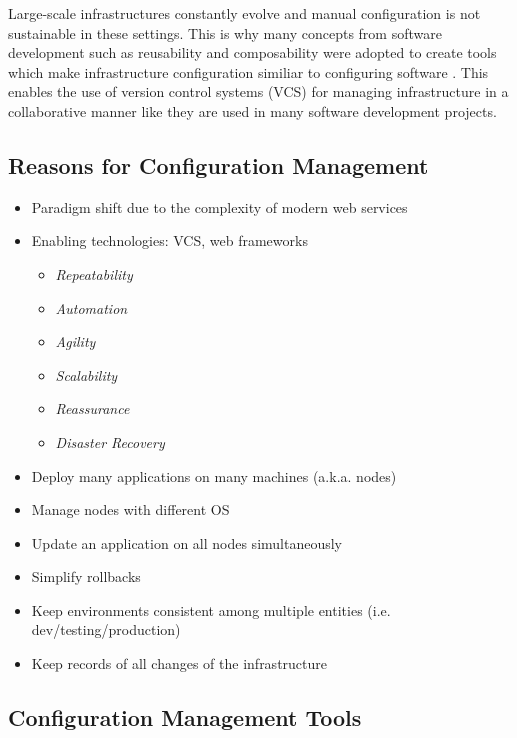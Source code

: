 Large-scale infrastructures constantly evolve and manual configuration is not sustainable in these settings. This is why many concepts from software development such as reusability and composability were adopted to create tools which make infrastructure configuration similiar to configuring software \cite{kanies2006puppet}. This enables the use of version control systems (VCS) for managing infrastructure in a collaborative manner like they are used in many software development projects.

\subsection{Reasons for Configuration Management}

	\begin{itemize}
		\item Paradigm shift due to the complexity of modern web services
		\item Enabling technologies: VCS, web frameworks
			\begin{itemize}
			\item \textit{Repeatability}
			\item \textit{Automation}
			\item \textit{Agility}
			\item \textit{Scalability}
			\item \textit{Reassurance}
			\item \textit{Disaster Recovery}
			\end{itemize}
	\end{itemize}


	\begin{itemize}
		\item Deploy many applications on many machines (a.k.a. nodes)
		\item Manage nodes with different OS
		\item Update an application on all nodes simultaneously
		\item Simplify rollbacks
		\item Keep environments consistent among multiple entities (i.e. dev/testing/production)
		\item Keep records of all changes of the infrastructure
	\end{itemize}

\subsection{Configuration Management Tools}

